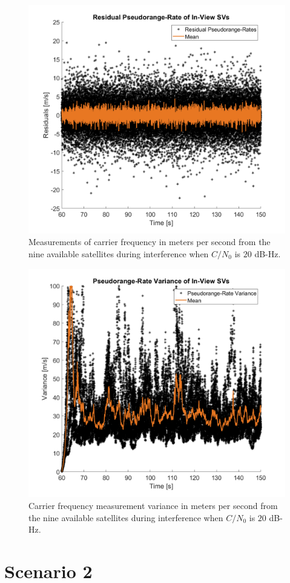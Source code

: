 \begin{figure}[!ht]
    \centering
    \includegraphics[width=0.75\linewidth]{Figures/Results/Scenario1/Case20/carrierFreq.png}
    \caption{Measurements of carrier frequency in meters per second from the nine available satellites during interference when \(C/N_0\) is \(20\) dB-Hz.}\label{fig:carrier20}
\end{figure}

\begin{figure}[!ht]
    \centering
    \includegraphics[width=0.75\linewidth]{Figures/Results/Scenario1/Case20/carrierVariance.png}
    \caption{Carrier frequency measurement variance in meters per second from the nine available satellites during interference when \(C/N_0\) is \(20\) dB-Hz.}\label{fig:carrierVariance20}
\end{figure}
\clearpage

\section{\textbf{Scenario 2}}

